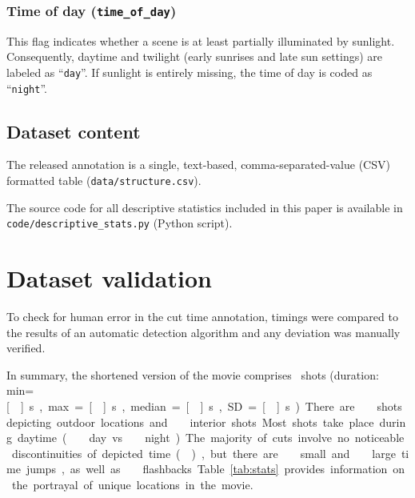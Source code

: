 \documentclass[10pt,a4paper]{article}
\begin{document}
\begin{multicols}{2}
\subsubsection*{Time of day (\texttt{time\_of\_day})}

This flag indicates whether a scene is at least partially illuminated by
sunlight. Consequently, daytime and twilight (early sunrises and late sun
settings) are labeled as ``\texttt{day}''. If sunlight is entirely missing, the
time of day is coded as ``\texttt{night}''.



\subsection*{Dataset content}

The released annotation is a single, text-based, comma-separated-value (CSV)
formatted table (\texttt{data/structure.csv}).

The source code for all descriptive statistics included in this paper is
available in \texttt{code/descriptive\_stats.py} (Python script).


\section*{Dataset validation}

To check for human error in the cut time annotation, timings were compared to
the results of an automatic detection algorithm and any deviation was manually
verified.

In summary, the shortened version of the movie comprises \NShots\ shots
(duration: min=\unit[\ShotLengthMin]{s}, max=\unit[\ShotLengthMax]{s},
median=\unit[\ShotLengthMedian]{s}, SD=\unit[\ShotLengthSD]{s}). There are
\NExteriorShots\ shots depicting outdoor locations and \NInteriorShots\
interior shots. Most shots take place during daytime (\NDayShots\ day
vs.~\NNightShots\ night). The majority of cuts involve no
noticeable discontinuities of depicted time (\NShotsTimeNoJump), but there are
\NShotsTimeSmallJump\ small and \NShotsTimeLargeJump\ large time jumps, as
well as \NShotsTimeFlashback\ flashbacks.

Table \ref{tab:stats} provides information on the portrayal of unique locations
in the movie.



\end{multicols}
\end{document}
